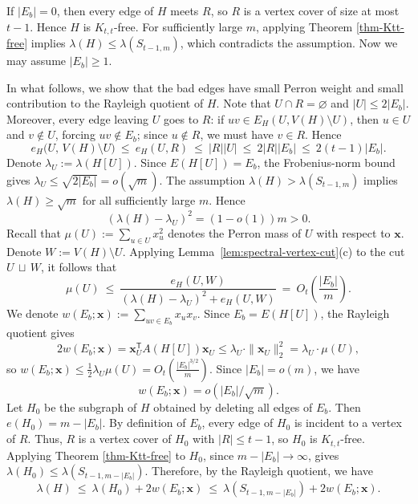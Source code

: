 \documentclass[11pt]{article}
\theoremstyle{definition}
\theoremstyle{plain}
\newcommand{\Ktt}{K_{t,t}}
\begin{document}
If $|E_b|=0$, then every edge of $H$ meets $R$, so \(R\) is a vertex cover of size at most \(t-1\). Hence $H$ is $\Ktt$-free.
For sufficiently large $m$, applying Theorem \ref{thm-Ktt-free} implies $\lambda(H)\le \lambda(S_{t-1,m})$, which contradicts the assumption. 
Now we may assume $|E_b|\ge 1$.

\smallskip
In what follows, we show that the bad edges have small Perron weight and small contribution to the Rayleigh quotient of $H$. 
Note that $U\cap R=\varnothing$ and $|U|\le 2|E_b|$. Moreover, every edge leaving $U$ goes to $R$:
if $uv\in E_H(U, V(H)\setminus U)$, then $u\in U$ and $v\notin U$, forcing $uv \notin E_b$; since \(u\notin R\), we must have $v\in R$.
Hence
\[
  e_H\!\bigl(U,\,V(H)\setminus U\bigr)\ \le \ e_H(U,R)\ \le\ |R||U|\ \le\ 2|R| |E_b|\ \le\ 2(t-1)|E_b|.
\]
Denote $\lambda_{U}:=\lambda(H[U])$. Since \(E(H[U])=E_b\), the Frobenius-norm bound gives $\lambda_{U} \le  \sqrt{2|E_b|} = o(\sqrt{m}).$
The assumption $\lambda(H)>\lambda(S_{t-1,m})$ implies $\lambda(H)\ge \sqrt{m}$ for all sufficiently large $m$. Hence
\[
        (\lambda(H)-\lambda_{U})^2=(1-o(1))m>0.
\]
Recall that $\mu(U):=\sum_{u\in U} x_u^2$ denotes the Perron mass of $U$ with respect to $\bm{x}$. 
Denote $W:=V(H)\setminus U$. 
Applying Lemma~\ref{lem:spectral-vertex-cut}\textup{(c)} to the cut $U\,\sqcup\,W$, it follows that  
\[
  \mu(U)
  \ \le\
  \frac{e_H(U,W)}{(\lambda(H)-\lambda_{U})^2+e_H(U,W)}
  \ =\ O_t\!\left(\frac{|E_b|}{m}\right).
\]
We denote $w(E_b; \bm{x}) := \sum_{uv\in E_b} x_ux_v$. 
Since $E_b=E(H[U])$, the Rayleigh quotient gives  
\[
  2w(E_b; \bm{x})
  =\bm{x}_{U}^{\mathsf T}A(H[U]) \bm{x}_U
  \le
  \lambda_U \cdot \| \bm{x}_U\|_2^2
  =
  \lambda_U\cdot \mu(U),
\]
so $w(E_b; \bm{x})
        \le
        \frac12\lambda_U \mu(U)
        =
        O_t\!\left(\frac{|E_b|^{3/2}}{m}\right).$
Since $|E_b|=o(m)$, we have
\begin{equation}
    \label{eq-bad-edge-small}
    w(E_b; \bm{x}) = o \left(|E_b| \big/\sqrt{m} \right). 
\end{equation} 
Let $H_0 $ be the subgraph of $H$ obtained by deleting all edges of $E_b$.
Then $e(H_0)=m- |E_b|$. By definition of $E_b$, every edge of $H_0$ is incident to a vertex of $R$.
Thus, $R$ is a vertex cover of $H_0$ with $|R|\le t-1$, so $H_0$ is $\Ktt$-free.
Applying Theorem \ref{thm-Ktt-free} to $H_0$, since \(m-|E_b|\to\infty\), gives
$\lambda(H_0) \le \lambda(S_{t-1,m- |E_b|}).$
Therefore, by the Rayleigh quotient, we have 
\begin{equation}\label{eq:sparseC-rowcover-lamH-upper}
  \lambda(H)\ \le \ \lambda(H_0)+2w(E_b; \bm{x}) \ \le\ \lambda(S_{t-1,m-|E_b|}) + 2w(E_b;\bm{x}).
\end{equation}
\end{document}
